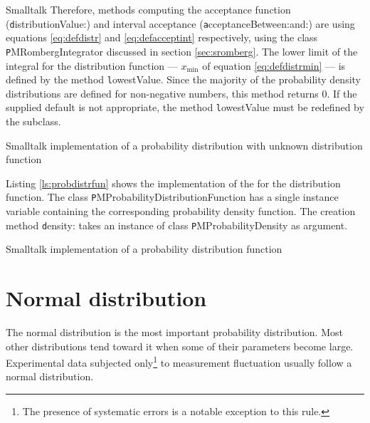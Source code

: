 \begin{displaycode}{Smalltalk}
Therefore, methods computing the acceptance function ({\texttt
distributionValue:}) and interval acceptance ({\texttt
acceptanceBetween:and:}) are using equations \ref{eq:defdistr} and
\ref{eq:defacceptint} respectively, using the class {\texttt
PMRombergIntegrator} discussed in section \ref{sec:sromberg}. The
lower limit of the integral for the distribution function ---
$x_{\min}$ of equation \ref{eq:defdistrmin} --- is defined by the
method {\texttt lowestValue}. Since the majority of the probability
density distributions are defined for non-negative numbers, this
method returns 0. If the supplied default is not appropriate, the
method {\texttt lowestValue} must be redefined by the subclass.

\begin{listing} Smalltalk implementation of a probability distribution with unknown
distribution function\label{ls:probunkdistr}
%
\end{listing}

Listing \ref{ls:probdistrfun} shows the implementation of the
 for the distribution function. The class {\texttt
PMProbabilityDistributionFunction} has a single instance variable
containing the corresponding probability density function. The
creation method {\texttt density:} takes an instance of class {\texttt
PMProbabilityDensity} as argument.

\begin{listing} Smalltalk implementation of a probability distribution function
\label{ls:probdistrfun}
%
\end{listing}


\section{Normal distribution}
\label{sec:normdist} The normal distribution is the most important
probability distribution. Most other distributions tend toward it
when some of their parameters become large. Experimental data
subjected only\footnote{The presence of systematic errors is a
notable exception to this rule.} to measurement fluctuation
usually follow a normal distribution.


\end{displaycode}
